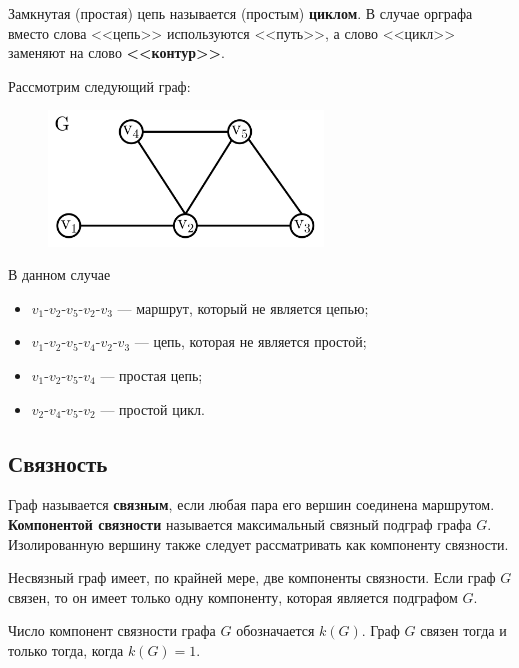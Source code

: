 Замкнутая (простая) цепь называется (простым) \textbf{циклом}. В случае орграфа вместо слова <<цепь>> используются <<путь>>, а слово <<цикл>> заменяют на слово \textbf{<<контур>>}.

\begin{example*}
    Рассмотрим следующий граф:

    \begin{figure}[H]
        \centering
        \includegraphics[width=0.65\textwidth]{./images/route-example.png}
    \end{figure}

    \noindent В данном случае
    \begin{itemize}
        \item \(v_1\)-\(v_2\)-\(v_5\)-\(v_2\)-\(v_3\) --- маршрут, который не является цепью;
        \item \(v_1\)-\(v_2\)-\(v_5\)-\(v_4\)-\(v_2\)-\(v_3\) --- цепь, которая не является простой;
        \item \(v_1\)-\(v_2\)-\(v_5\)-\(v_4\) --- простая цепь;
        \item \(v_2\)-\(v_4\)-\(v_5\)-\(v_2\) --- простой цикл.
    \end{itemize}
\end{example*}

\subsection{Связность}

Граф называется \textbf{связным}, если любая пара его вершин соединена маршрутом. \textbf{Компонентой связности} называется максимальный связный подграф графа \(G\). Изолированную вершину также следует рассматривать как компоненту связности.

Несвязный граф имеет, по крайней мере, две компоненты связности. Если граф \(G\) связен, то он имеет только одну компоненту, которая является подграфом \(G\).

Число компонент связности графа \(G\) обозначается \(k(G)\). Граф \(G\) связен тогда и только тогда, когда \(k(G) = 1\).


